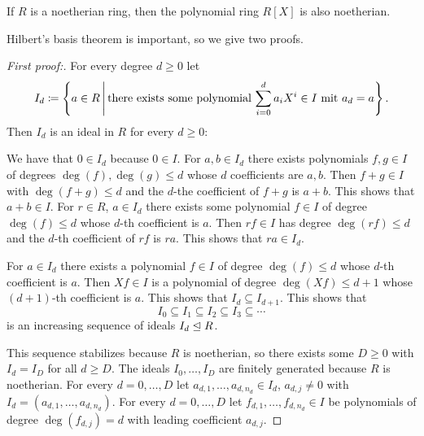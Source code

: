 \begin{theorem}
  \label{theorem: Hilberts basis theorem}
  If $R$ is a noetherian ring, then the polynomial ring $R[X]$ is also noetherian.
\end{theorem}


\begin{fluff}
  Hilbert’s basis theorem is important, so we give two proofs.
\end{fluff}


\begin{proof}[First proof:]
  For every degree $d \geq 0$ let
  \[
              I_d
    \coloneqq \left\{
                a \in R
              \suchthat*
                \text{there exists some polynomial $\sum_{i=0}^d a_i X^i \in I$ mit $a_d = a$}
              \right\}.
  \]
  Then $I_d$ is an ideal in $R$ for every $d \geq 0$:
  
  We have that $0 \in I_d$ because $0 \in I$.
  For $a, b \in I_d$ there exists polynomials $f, g \in I$ of degrees $\deg(f), \deg(g) \leq d$ whose $d$ coefficients are $a, b$.
  Then $f + g \in I$ with $\deg(f + g) \leq d$ and the $d$-the coefficient of $f+g$ is $a+b$.
  This shows that $a + b \in I$.
  For $r \in R$, $a \in I_d$ there exists some polynomial $f \in I$ of degree $\deg(f) \leq d$ whose $d$-th coefficient is $a$.
  Then $rf \in I$ has degree $\deg(rf) \leq d$ and the $d$-th coefficient of $rf$ is $ra$.
  This shows that $ra \in I_d$.
  
  For $a \in I_d$ there exists a polynomial $f \in I$ of degree $\deg(f) \leq d$ whose $d$-th coefficient is $a$.
  Then $Xf \in I$ is a polynomial of degree $\deg(Xf) \leq d+1$ whose $(d+1)$-th coefficient is $a$.
  This shows that $I_d \subseteq I_{d+1}$.
  This shows that
  \[
              I_0
    \subseteq I_1
    \subseteq I_2
    \subseteq I_3
    \subseteq \dotsb
  \]
  is an increasing sequence of ideals $I_d \trianglelefteq R$.
  
  This sequence stabilizes because $R$ is noetherian, so there exists some $D \geq 0$ with $I_d = I_D$ for all $d \geq D$.
  The ideals $I_0, \dotsc, I_D$ are finitely generated because $R$ is noetherian.
  For every $d = 0, \dotsc, D$ let $a_{d,1}, \dotsc, a_{d,n_d} \in I_d$, $a_{d,j} \neq 0$ with $I_d = (a_{d,1}, \dotsc, a_{d,n_d})$.
  For every $d = 0, \dotsc, D$ let $f_{d,1}, \dotsc, f_{d,n_d} \in I$ be polynomials of degree $\deg(f_{d,j}) = d$ with leading coefficient $a_{d,j}$.
  

\end{proof}
